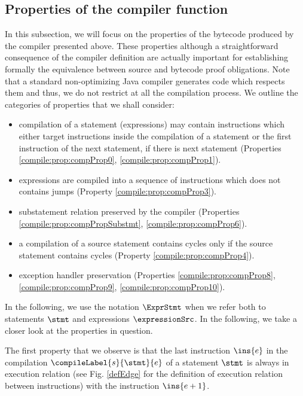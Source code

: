\subsection{Properties of the compiler function}\label{compile:prop}
In this subsection, we will focus on the properties of the  bytecode produced by the compiler presented above.
These properties although a straightforward consequence of the compiler definition
 are actually important for establishing formally the equivalence between source and bytecode 
proof obligations. Note that a standard non-optimizing Java compiler generates code which respects them and thus, we
do not restrict at all the compilation process.  We outline the categories of properties that we shall consider:
\begin{itemize}
     
     \item compilation of a statement (expressions) may contain instructions which either target instructions inside the compilation of a statement or  the 
           first instruction of the next statement, if there is next statement (Properties \ref{compile:prop:compProp0}, \ref{compile:prop:compProp1}).
     
     \item expressions are compiled into a sequence of instructions which does not contains jumps (Property \ref{compile:prop:compProp3}).
     
     \item substatement relation preserved by the compiler (Properties \ref{compile:prop:compPropSubstmt}, \ref{compile:prop:compProp6}).

     \item a compilation of a source statement contains cycles only if the source statement contains cycles (Property \ref{compile:prop:compProp4}).
     
     \item exception handler preservation (Properties \ref{compile:prop:compProp8}, \ref{compile:prop:compProp9},  \ref{compile:prop:compProp10}).
     
\end{itemize}




In the following, we use the notation $\ExprStmt$ when we refer both to statements $\stmt$ and expressions $\expressionSrc$.
In the following, we take a closer look at the properties in question.
 
 The first property that we observe is that the last instruction $\ins{e}$ in the compilation
 $\compileLabel{s}{\stmt}{e}$  of a statement $\stmt$ is always in execution relation
 (see Fig. \ref{defEdge} for the definition of execution relation between instructions) with the
 instruction $\ins{e + 1}$.


